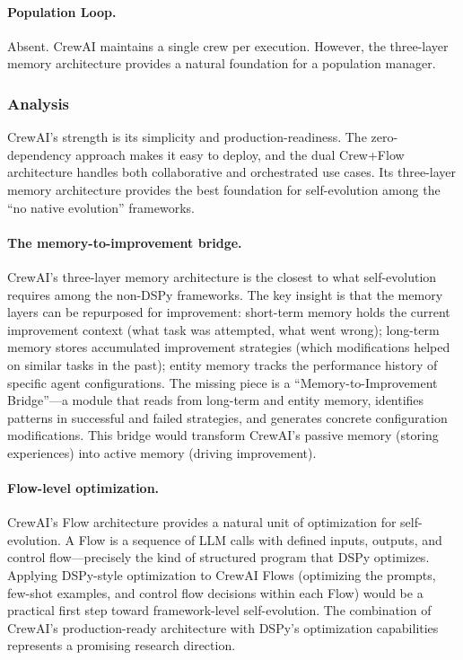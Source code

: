 \paragraph{Population Loop.}
Absent. CrewAI maintains a single crew per execution. However, the three-layer memory architecture provides a natural foundation for a population manager.

\subsubsection{Analysis}

CrewAI's strength is its simplicity and production-readiness. The zero-dependency approach makes it easy to deploy, and the dual Crew+Flow architecture handles both collaborative and orchestrated use cases. Its three-layer memory architecture provides the best foundation for self-evolution among the ``no native evolution'' frameworks.

\paragraph{The memory-to-improvement bridge.}
CrewAI's three-layer memory architecture is the closest to what self-evolution requires among the non-DSPy frameworks. The key insight is that the memory layers can be repurposed for improvement: short-term memory holds the current improvement context (what task was attempted, what went wrong); long-term memory stores accumulated improvement strategies (which modifications helped on similar tasks in the past); entity memory tracks the performance history of specific agent configurations. The missing piece is a ``Memory-to-Improvement Bridge''---a module that reads from long-term and entity memory, identifies patterns in successful and failed strategies, and generates concrete configuration modifications. This bridge would transform CrewAI's passive memory (storing experiences) into active memory (driving improvement).

\paragraph{Flow-level optimization.}
CrewAI's Flow architecture provides a natural unit of optimization for self-evolution. A Flow is a sequence of LLM calls with defined inputs, outputs, and control flow---precisely the kind of structured program that DSPy optimizes. Applying DSPy-style optimization to CrewAI Flows (optimizing the prompts, few-shot examples, and control flow decisions within each Flow) would be a practical first step toward framework-level self-evolution. The combination of CrewAI's production-ready architecture with DSPy's optimization capabilities represents a promising research direction.


